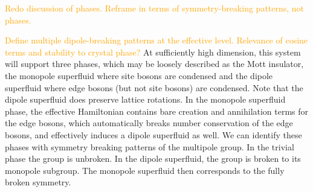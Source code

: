 \documentclass[pra,aps,twocolumn, amsfonts,amsmath,amssymb,nofootinbib,superscriptaddress]{revtex4}
\newcommand{\todo}[1]{\textcolor{orange}{#1}}
\begin{document}
\todo{Redo discussion of phases. Reframe in terms of symmetry-breaking patterns, not phases.}

\todo{Define multiple dipole-breaking patterns at the effective level. Relevance of cosine terms and stability to crystal phase?}
At sufficiently high dimension, this system will support three phases, which may be loosely described as the Mott insulator, the monopole superfluid where site bosons are condensed and the dipole superfluid where edge bosons (but not site bosons) are condensed. 
Note that the dipole superfluid does preserve lattice rotations.
In the monopole superfluid phase, the effective Hamiltonian contains bare creation and annihilation terms for the edge bosons, which automatically breaks number conservation of the edge bosons, and effectively induces a dipole superfluid as well. We can identify these phases with symmetry breaking patterns of the multipole group. In the trivial phase the group is unbroken. In the dipole superfluid, the group is broken to its monopole subgroup. The monopole superfluid then corresponds to the fully broken symmetry.






\end{document}
